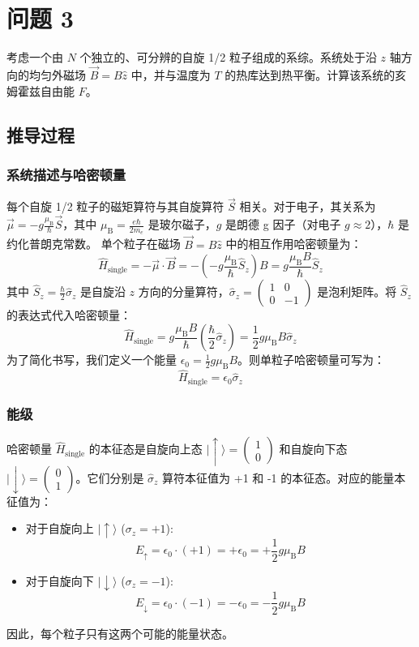 \documentclass[12pt, a4paper]{article}
\newcommand{\mub}{\mu_{\mathrm{B}}} %
\begin{document}
\section*{问题 3}
考虑一个由 \(N\) 个独立的、可分辨的自旋 1/2 粒子组成的系综。系统处于沿 \(z\) 轴方向的均匀外磁场 \(\vec{B} = B \hat{z}\) 中，并与温度为 \(T\) 的热库达到热平衡。计算该系统的亥姆霍兹自由能 \(F\)。
\subsection*{推导过程}
\subsubsection*{系统描述与哈密顿量}
每个自旋 1/2 粒子的磁矩算符与其自旋算符 \(\vec{S}\) 相关。对于电子，其关系为 \(\vec{\mu} = -g \frac{\mub}{\hbar} \vec{S}\)，其中 \(\mub = \frac{e\hbar}{2m_e}\) 是玻尔磁子，\(g\) 是朗德 g 因子（对电子 \(g \approx 2\)），\(\hbar\) 是约化普朗克常数。
单个粒子在磁场 \(\vec{B} = B \hat{z}\) 中的相互作用哈密顿量为：
\[
\hat{H}_{\text{single}} = -\vec{\mu} \cdot \vec{B} = - \left(-g \frac{\mub}{\hbar} \hat{S}_z\right) B = g \frac{\mub B}{\hbar} \hat{S}_z
\]
其中 \(\hat{S}_z = \frac{\hbar}{2} \hat{\sigma}_z\) 是自旋沿 \(z\) 方向的分量算符，\(\hat{\sigma}_z = \begin{pmatrix} 1 & 0 \\ 0 & -1 \end{pmatrix}\) 是泡利矩阵。将 \(\hat{S}_z\) 的表达式代入哈密顿量：
\[
\hat{H}_{\text{single}} = g \frac{\mub B}{\hbar} \left(\frac{\hbar}{2} \hat{\sigma}_z\right) = \frac{1}{2} g \mub B \hat{\sigma}_z
\]
为了简化书写，我们定义一个能量 \(\epsilon_0 = \frac{1}{2} g \mub B\)。则单粒子哈密顿量可写为：
\[
\hat{H}_{\text{single}} = \epsilon_0 \hat{\sigma}_z
\]
\subsubsection*{能级}
哈密顿量 \(\hat{H}_{\text{single}}\) 的本征态是自旋向上态 \(|\uparrow\rangle = \begin{pmatrix} 1 \\ 0 \end{pmatrix}\) 和自旋向下态 \(|\downarrow\rangle = \begin{pmatrix} 0 \\ 1 \end{pmatrix}\)。它们分别是 \(\hat{\sigma}_z\) 算符本征值为 +1 和 -1 的本征态。对应的能量本征值为：
\begin{itemize}
    \item 对于自旋向上 \(|\uparrow\rangle\) (\(\sigma_z = +1\)): 
    \[ E_\uparrow = \epsilon_0 \cdot (+1) = +\epsilon_0 = +\frac{1}{2} g \mub B \]
    \item 对于自旋向下 \(|\downarrow\rangle\) (\(\sigma_z = -1\)): 
    \[ E_\downarrow = \epsilon_0 \cdot (-1) = -\epsilon_0 = -\frac{1}{2} g \mub B \]
\end{itemize}
因此，每个粒子只有这两个可能的能量状态。
\end{document}
